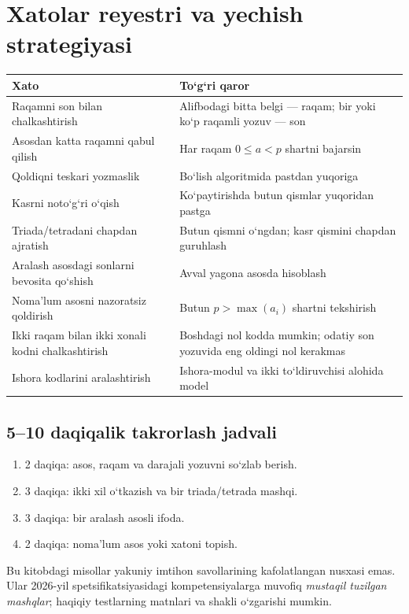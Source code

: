 \documentclass[11pt,a4paper,openany,oneside]{book}
\begin{document}
\chapter{Xatolar reyestri va yechish strategiyasi}
\begin{center}\small\renewcommand{\arraystretch}{1.3}\begin{tabularx}{\textwidth}{@{}p{38mm}X@{}}\toprule
Xato & To‘g‘ri qaror \\ \midrule
Raqamni son bilan chalkashtirish & Alifbodagi bitta belgi — raqam; bir yoki ko‘p raqamli yozuv — son \\
Asosdan katta raqamni qabul qilish & Har raqam \(0\le a<p\) shartni bajarsin \\
Qoldiqni teskari yozmaslik & Bo‘lish algoritmida pastdan yuqoriga \\
Kasrni noto‘g‘ri o‘qish & Ko‘paytirishda butun qismlar yuqoridan pastga \\
Triada/tetradani chapdan ajratish & Butun qismni o‘ngdan; kasr qismini chapdan guruhlash \\
Aralash asosdagi sonlarni bevosita qo‘shish & Avval yagona asosda hisoblash \\
Noma’lum asosni nazoratsiz qoldirish & Butun \(p>\max(a_i)\) shartni tekshirish \\
Ikki raqam bilan ikki xonali kodni chalkashtirish & Boshdagi nol kodda mumkin; odatiy son yozuvida eng oldingi nol kerakmas \\
Ishora kodlarini aralashtirish & Ishora-modul va ikki to‘ldiruvchisi alohida model \\
\bottomrule\end{tabularx}\end{center}
\section{5–10 daqiqalik takrorlash jadvali}
\begin{enumerate}
\item 2 daqiqa: asos, raqam va darajali yozuvni so‘zlab berish.
\item 3 daqiqa: ikki xil o‘tkazish va bir triada/tetrada mashqi.
\item 3 daqiqa: bir aralash asosli ifoda.
\item 2 daqiqa: noma’lum asos yoki xatoni topish.
\end{enumerate}
\begin{important}
Bu kitobdagi misollar yakuniy imtihon savollarining kafolatlangan nusxasi emas. Ular 2026-yil spetsifikatsiyasidagi kompetensiyalarga muvofiq \emph{mustaqil tuzilgan mashqlar}; haqiqiy testlarning matnlari va shakli o‘zgarishi mumkin.
\end{important}
\end{document}
